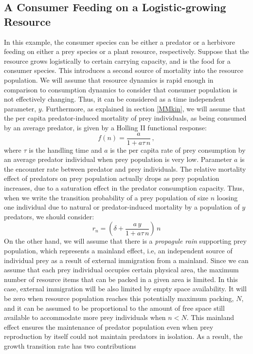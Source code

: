 \subsection{A Consumer Feeding on a Logistic-growing Resource}
In this example, the consumer species can be either a predator or a herbivore feeding on either a prey species or a plant resource, respectively. Suppose that the resource grows logistically to certain carrying capacity, and is the food for a consumer species. This introduces a second source of mortality into the resource population. We will assume that resource dynamics is rapid enough in comparison to consumption dynamics to consider that consumer population is not effectively changing. Thus, it can be considered as a time independent parameter, $y$. Furthermore, as explained in section \ref{MMkin}, we will assume that the per capita predator-induced mortality of prey individuals, as being consumed by an average predator, is given by a Holling II functional response:
\begin{equation}
f(n) = \frac{a}{1+a\tau\,n}\,,
\end{equation}
where $\tau$ is the handling time and $a$ is the per capita rate of prey consumption by an average predator individual when prey population is very low. Parameter $a$ is the encounter rate between predator and prey individuals. The relative mortality effect of predators on prey population actually drops as prey population increases, due to a saturation effect in the predator consumption capacity. Thus, when we write the transition probability of a prey population of size $n$ loosing one individual due to natural or predator-induced mortality by a population of $y$ predators, we should consider:
\begin{equation}
\label{r_2}
r_{n}  =  \left(\delta + \frac{a\,y}{1+a\tau\,n}\right)\,n 
\end{equation}
On the other hand, we will assume that there is a {\em  propagule rain} \citep{Gotelli93} supporting prey population, which represents a mainland effect, i.e, an independent source of individual prey as a result of external immigration from a mainland. Since we can assume that each prey individual occupies certain physical area, the maximum number of resource items that can be packed in a given area is limited. In this case, external immigration will be also limited by empty space availability. It will be zero when resource population reaches this potentially maximum packing, $N$, and it can be assumed to be proportional to the amount of free space still available to accommodate more prey individuals when $n < N$. This mainland effect ensures the maintenance of predator population even when prey reproduction by itself could not maintain predators in isolation. As a result, the growth transition rate has two contributions
